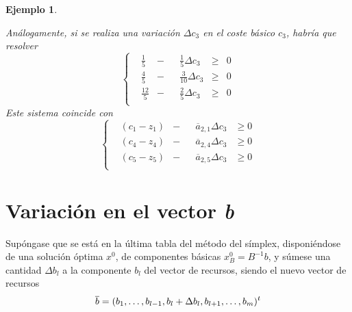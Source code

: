 \documentclass[11pt]{report}
\theoremstyle{mytheorem}
\theoremstyle{mydefinition}
\theoremstyle{myexample}
\newtheorem*{example}{Ejemplo}
\begin{document}
\begin{example}
\begin{enumerate}
Análogamente, si se realiza una variación $\Delta c_3$ en el coste básico $c_3$, habría que resolver
\[\left\{\begin{alignedat}{10}
& \frac{1}{5}  & {}-{} & &\frac{1}{5}\Delta c_3  & {}\geq{} & 0 \\[5pt]
& \frac{4}{5}  & {}-{} & &\frac{3}{10}\Delta c_3  & {}\geq{} & 0 \\[5pt]
& \frac{12}{5} & {}-{} & &\frac{2}{5}\Delta c_3 & {}\geq{} & 0 \\
\end{alignedat}\right.\]
Este sistema coincide con
\[\left\{\begin{alignedat}{10}
& (c_1-z_1) & {}-{} & &\overline{a}_{2,1}\Delta c_3  & {}\geq{} 0 \\[5pt]
& (c_4-z_4) & {}-{} & &\overline{a}_{2,4}\Delta c_3  & {}\geq{} 0 \\[5pt]
& (c_5-z_5) & {}-{} & &\overline{a}_{2,5}\Delta c_3  & {}\geq{} 0 \\
\end{alignedat}\right.\]
\end{enumerate}
\end{example}

\section{Variación en el vector \textit{b}}

Supóngase que se está en la última tabla del método del símplex, disponiéndose de una solución óptima $x^0$, de componentes básicas $x^0_B = B^{-1}b$, y súmese una cantidad $\Delta b_l$ a la componente $b_l$ del vector de recursos, siendo el nuevo vector de recursos 
\[\overline{b} = 
(b_1,\mathellipsis,b_{l-1},b_l+\Delta b_l,b_{l+1},\mathellipsis,b_m)^t\]
\end{document}
